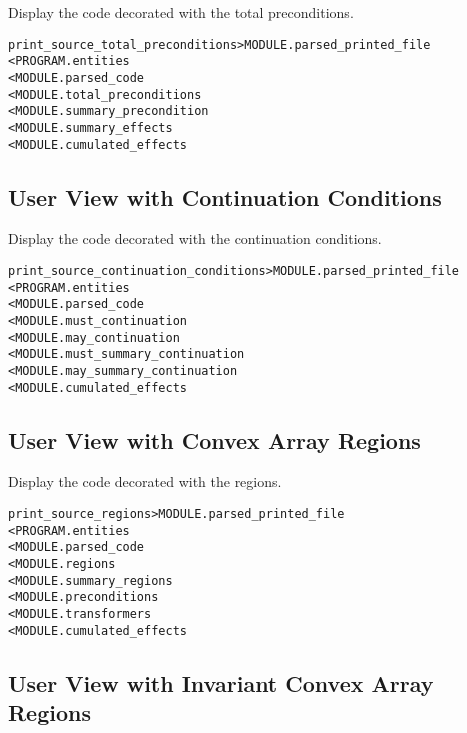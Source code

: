 \documentclass[a4paper]{report}
\newenvironment{PipsMake}{\begin{alltt}}{\end{alltt}}
\newenvironment{PipsPass}[1]{\label{pass:#1}}{}
\begin{document}
\begin{PipsPass}{print_source_total_preconditions}
Display the code decorated with the total preconditions.
\end{PipsPass}

\begin{PipsMake}
print_source_total_preconditions        > MODULE.parsed_printed_file
        < PROGRAM.entities
        < MODULE.parsed_code
        < MODULE.total_preconditions
        < MODULE.summary_precondition
        < MODULE.summary_effects
        < MODULE.cumulated_effects
\end{PipsMake}

\subsection{User View with Continuation Conditions}

\begin{PipsPass}{print_source_continuation_conditions}
Display the code decorated with the continuation conditions.
\end{PipsPass}

\begin{PipsMake}
print_source_continuation_conditions   > MODULE.parsed_printed_file
        < PROGRAM.entities
        < MODULE.parsed_code
        < MODULE.must_continuation
        < MODULE.may_continuation
        < MODULE.must_summary_continuation
        < MODULE.may_summary_continuation
        < MODULE.cumulated_effects
\end{PipsMake}

\subsection{User View with Convex Array Regions}

\begin{PipsPass}{print_source_regions}
Display the code decorated with the regions.
\end{PipsPass}

\begin{PipsMake}
print_source_regions              > MODULE.parsed_printed_file
        < PROGRAM.entities
        < MODULE.parsed_code
        < MODULE.regions
        < MODULE.summary_regions
        < MODULE.preconditions
        < MODULE.transformers
        < MODULE.cumulated_effects
\end{PipsMake}

\subsection{User View with Invariant Convex Array  Regions}
\end{document}
